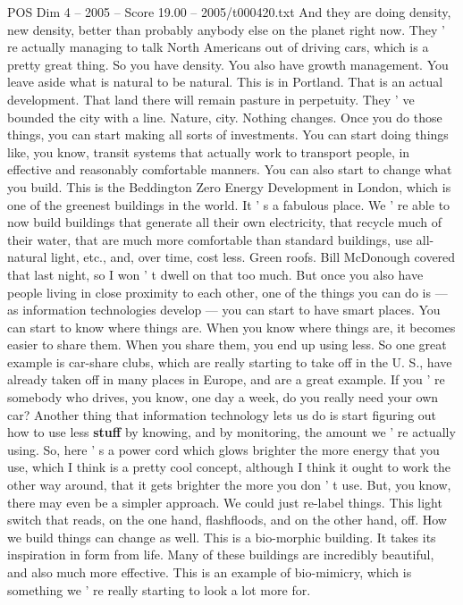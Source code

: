 \begin{textsample}{POS Dim 4 – 2005 – Score 19.00 – 2005/t000420.txt}
And they are doing density, new density, better than probably anybody else on the planet right now.
They ' re actually managing to talk North Americans out of driving cars, which is a pretty great thing.
So you have density.
You also have growth management.
You leave aside what is natural to be natural.
This is in Portland.
That is an actual development.
That land there will remain pasture in perpetuity.
They ' ve bounded the city with a line.
Nature, city.
Nothing changes.
Once you do those things, you can start making all sorts of investments.
You can start doing things like, you know, transit systems that actually work to transport people, in effective and reasonably comfortable manners.
You can also start to change what you build.
This is the Beddington Zero Energy Development in London, which is one of the greenest buildings in the world.
It ' s a fabulous place.
We ' re able to now build buildings that generate all their own electricity, that recycle much of their water, that are much more comfortable than standard buildings, use all-natural light, etc., and, over time, cost less.
Green roofs.
Bill McDonough covered that last night, so I won ' t dwell on that too much.
But once you also have people living in close proximity to each other, one of the things you can do is — as information technologies develop — you can start to have smart places.
You can start to know where things are.
When you know where things are, it becomes easier to share them.
When you share them, you end up using less.
So one great example is car-share clubs, which are really starting to take off in the U.
S., have already taken off in many places in Europe, and are a great example.
If you ' re somebody who drives, you know, one day a week, do you really need your own car?
Another thing that information technology lets us do is start figuring out how to use less \textbf{stuff} by knowing, and by monitoring, the amount we ' re actually using.
So, here ' s a power cord which glows brighter the more energy that you use, which I think is a pretty cool concept, although I think it ought to work the other way around, that it gets brighter the more you don ' t use.
But, you know, there may even be a simpler approach.
We could just re-label things.
This light switch that reads, on the one hand, flashfloods, and on the other hand, off.
How we build things can change as well.
This is a bio-morphic building.
It takes its inspiration in form from life.
Many of these buildings are incredibly beautiful, and also much more effective.
This is an example of bio-mimicry, which is something we ' re really starting to look a lot more for.

\end{textsample}
